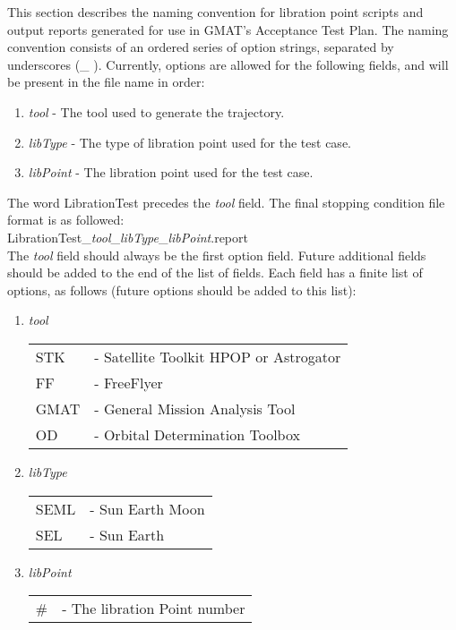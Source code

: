 This section describes the naming convention for libration point
scripts and output reports generated for use in GMAT's Acceptance
Test Plan. The naming convention consists of an ordered series of
option strings, separated by underscores (\_ ). Currently, options
are allowed for the following fields, and will be present in the
file name in order:
\begin{enumerate}
  \item \emph{tool} - The tool used to generate the trajectory.
  \item \emph{libType} - The type of libration point used for the test
  case.
  \item \emph{libPoint} - The libration point used for the test
  case.
\end{enumerate}

The word LibrationTest precedes the \emph{tool} field. The final
stopping condition file format is as followed:\\
LibrationTest\_\emph{tool}\_\emph{libType}\_\emph{libPoint}.report\\

The \emph{tool} field should always be the first option field.
Future additional fields should be added to the end of the list of
fields. Each field has a finite list of options, as follows (future
options should be added to this list):
\begin{enumerate}
  \item \emph{tool}
  \begin{tabular}{ll}
    STK  & - Satellite Toolkit HPOP or Astrogator\\
    FF   & - FreeFlyer\\
    GMAT & - General Mission Analysis Tool\\
    OD   & - Orbital Determination Toolbox\\
  \end{tabular}

  \item \emph{libType}
  \begin{tabular}{ll}
    SEML & - Sun Earth Moon\\
    SEL  & - Sun Earth\\
  \end{tabular}

  \item \emph{libPoint}
  \begin{tabular}{ll}
    \#   & - The libration Point number\\
  \end{tabular}
\end{enumerate}
